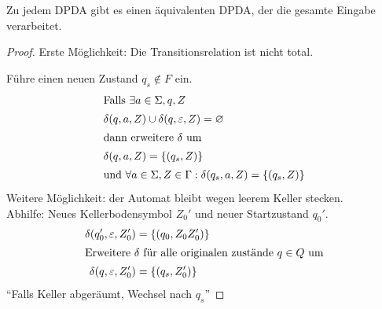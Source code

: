 \begin{lemma}[name={[\acs*{DPDA}, der gesamte Eingabe verarbeitet]}]
	\label{lem:DPDA ges. Eingabe}
	Zu jedem \ac{DPDA} gibt es einen äquivalenten \ac{DPDA}, der die gesamte Eingabe verarbeitet.
\end{lemma}
\begin{proof}
    Erste Möglichkeit: Die Transitionsrelation ist nicht total.

	Führe einen neuen Zustand $q_s\notin F$ ein.
	\begin{align*}
	\shortintertext{Falls $\exists a\in\Sigma, q, Z$}
		\delta(q,a,Z) &\cup \delta(q,\varepsilon,Z) = \varnothing\\
	\shortintertext{dann erweitere $\delta$ um}
		\delta(q,a,Z) &= \{ (q_s,Z) \}\\
	\shortintertext{und $\forall a\in\Sigma, Z\in \Gamma: \delta(q_s,a,Z) = \{(q_s,Z)\}$}
	\end{align*}
	Weitere Möglichkeit: der Automat bleibt wegen leerem Keller stecken.\\
	Abhilfe: Neues Kellerbodensymbol $Z_0'$ und neuer Startzustand $q_0'$.
	\begin{align*}
		\delta(q_0',\varepsilon,Z_0') &= \{(q_0,Z_0Z_0')\}\\
	\shortintertext{Erweitere $\delta$ für alle originalen zustände $q\in Q$ um}
		\delta(q,\varepsilon,Z_0') &= \{(q_s,Z_0')\}
	\end{align*}
	"`Falls Keller abgeräumt, Wechsel nach $q_s$"'
\end{proof}

